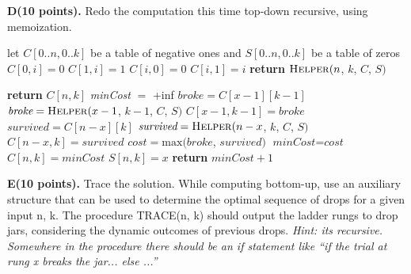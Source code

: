 \documentclass[11pt]{article}
\theoremstyle{definition}
\theoremstyle{theorem}
\newcommand{\solution}{\medskip\noindent{\color{DarkBlue}\textbf{Solution:}}}
\begin{document}
\newpage
\noindent\textbf{D(10 points).} Redo the computation this time top-down recursive, using memoization.

\solution

\begin{algorithmic}[1]
	\State let $C[0..n, 0..k]$ be a table of negative ones and $S[0..n, 0..k]$ be a table of zeros
		\State $C[0, i] = 0$
		\State $C[1, i] = 1$
	\EndFor
		\State $C[i, 0] = 0$
		\State $C[i, 1] = i$
	\EndFor
	\State \textbf{return} $\textproc{\textsc{Helper}}(n$, $k$, $C$, $S)$
\EndFunction
\end{algorithmic}

\begin{algorithmic}[1]
		\State \textbf{return} $C[n, k]$
	\EndIf
	\State \textit{minCost} $= $ +inf
		\State $\textit{broke} = C[x-1][k-1]$
			\State $\textit{broke} = \textproc{\textsc{Helper}}(x-1$, $k-1$, $C$, $S)$
			\State $C[x-1, k-1] = \textit{broke}$
		\EndIf
		\State $\textit{survived} = C[n - x][k]$
			\State $\textit{survived} = \textproc{\textsc{Helper}}(n - x$, $k$, $C$, $S)$
			\State $C[n-x, k] = \textit{survived}$
		\EndIf
		\State $\textit{cost} = \text{max}(\textit{broke}$, $\textit{survived})$
			\State $\textit{minCost} = \textit{cost}$
			\State $C[n, k] = \textit{minCost}$
			\State $S[n, k] = x$
		\EndIf
	\EndFor
	\State \textbf{return} $\textit{minCost} + 1$
\EndFunction
\end{algorithmic}


\newpage
\noindent\textbf{E(10 points).} Trace  the  solution.   While  computing  bottom-up,  use  an  auxiliary structure  that  can  be  used  to  determine  the  optimal  sequence  of  drops  for  a  given input n, k.  The procedure TRACE(n, k) should output the ladder rungs to drop jars, considering the dynamic outcomes of previous drops. \textit{Hint:  its recursive.  Somewhere in the procedure there should be an if statement like “if the trial at rung x breaks the jar...  else ...”}

\solution
\end{document}

